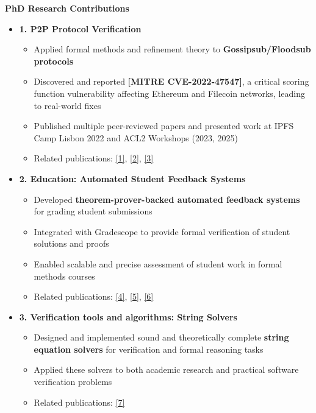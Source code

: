 \documentclass[11pt,letterpaper]{article}
\begin{document}
\textbf{PhD Research Contributions}
\begin{itemize}
    \item \textbf{1. P2P Protocol Verification}
          \begin{itemize}
              \item Applied formal methods and refinement theory to \textbf{Gossipsub/Floodsub protocols}
              \item Discovered and reported \textbf{[MITRE CVE-2022-47547]}, a critical scoring function vulnerability affecting Ethereum and Filecoin networks, leading to real-world fixes
              \item Published multiple peer-reviewed papers and presented work at IPFS Camp Lisbon 2022 and ACL2 Workshops (2023, 2025)
              \item Related publications: \href{https://ankitku.github.io/papers/floodsub_acl2w_2025.pdf}{[1]}, \href{https://ankitku.github.io/papers/gossipsub_ieeesp_2024.pdf}{[2]}, \href{https://ankitku.github.io/papers/gossipsub_acl2w_2023.pdf}{[3]}
          \end{itemize}
    \item \textbf{2. Education: Automated Student Feedback Systems}
          \begin{itemize}
              \item Developed \textbf{theorem-prover-backed automated feedback systems} for grading student submissions
              \item Integrated with Gradescope to provide formal verification of student solutions and proofs
              \item Enabled scalable and precise assessment of student work in formal methods courses
              \item Related publications: \href{https://ankitku.github.io/papers/automata_grading_eptcs_2023.pdf}{[4]}, \href{https://ankitku.github.io/papers/calculational_proofs_acl2w_2023.pdf}{[5]}, \href{https://arxiv.org/abs/2301.01234}{[6]}
          \end{itemize}
    \item \textbf{3. Verification tools and algorithms: String Solvers}
          \begin{itemize}
              \item Designed and implemented sound and theoretically complete \textbf{string equation solvers} for verification and formal reasoning tasks
              \item Applied these solvers to both academic research and practical software verification problems
              \item Related publications: \href{https://ankitku.github.io/papers/mpms_fmcad_2021.pdf}{[7]}
          \end{itemize}
\end{itemize}
\end{document}
